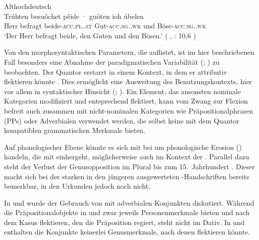 \begin{exe}
\ex \label{ex:beidejohahd_2_copy}
	\langinfo%
		{Althochdeutsch}%
		{}%
		{\cite[35]{tax1979}}\\
	\gll Trúhten besuôchet pêide · guôten ioh úbelen \\
			Herr befragt beide-\textsc{acc.pl.\MascA.st} {}
				Gut-\textsc{acc.sg.\MascA.wk} und
				Böse-\textsc{acc.sg.\MascA.wk} \\
		\trans `Der Herr befragt beide, den Guten und den Bösen.'
			(%
				, : 10,6%
			)
\end{exe}

Von den morphosyntaktischen Parametern, die \citet[174]{lehmann2015} auflistet,
ist im hier beschriebenen Fall besonders eine Abnahme der
paradigmatischen Variabilität (;
\cite[146--150]{lehmann2015}) zu beobachten. Der Quantor erstarrt in einem
Kontext, in dem er attributiv flektieren könnte
. Dies ermöglicht eine Ausweitung des Benutzungskontexts,
hier vor allem in syntaktischer Hinsicht (; \cite[150--151]{lehmann2015}). Ein Element, das ansonsten
nominale Kategorien modifiziert und entsprechend flektiert, kann vom Zwang zur
Flexion befreit auch zusammen mit nicht-nominalen Kategorien wie
Präpositionalphrasen (PPs) oder
Adverbialen verwendet werden, die selbst keine mit dem Quantor
kompatiblen grammatischen Merkmale bieten.

Auf phonologischer Ebene könnte es sich mit \citet[134--136]{lehmann2015} bei
 um phonologische Erosion () handeln,
die mit  einhergeht, möglicherweise auch im Kontext
der  \autocite[88--92]{braune2018}. Parallel dazu
steht der Verlust der Genusopposition im Plural
bis zum 15.~Jahrhundert
\autocites[203]{paul2007}[191--192]{reichmannwegera1993}. Dieser macht sich bei
der starken  in den jüngeren ausgewerteten
\KC{}-Handschriften bereits bemerkbar, in den Urkunden jedoch noch
nicht.

In  und 
wurde der Gebrauch von  mit adverbialen Konjunkten
diskutiert. Während die Präpositionalobjekte in  und
 zwar jeweils Personenmerkmale
bieten und nach dem Kasus flektieren, den die Präposition regiert, steht
 nicht im Dativ. In  und
 enthalten die Konjunkte keinerlei
Genusmerkmale, nach denen  flektieren könnte.

